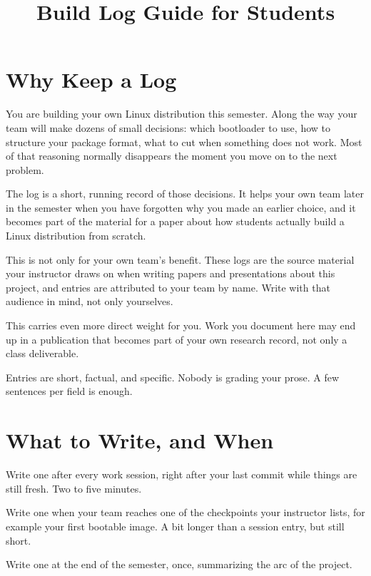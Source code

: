 \documentclass[11pt]{article}
\title{Build Log Guide for Students}
\author{}
\date{}
\begin{document}
\thispagestyle{fancy}


\section{Why Keep a Log}

You are building your own Linux distribution this semester. Along the way your team will make dozens of small decisions: which bootloader to use, how to structure your package format, what to cut when something does not work. Most of that reasoning normally disappears the moment you move on to the next problem.

The log is a short, running record of those decisions. It helps your own team later in the semester when you have forgotten why you made an earlier choice, and it becomes part of the material for a paper about how students actually build a Linux distribution from scratch.

This is not only for your own team's benefit. These logs are the source material your instructor draws on when writing papers and presentations about this project, and entries are attributed to your team by name. Write with that audience in mind, not only yourselves.

\begin{tipBox}
This carries even more direct weight for you. Work you document here may end up in a publication that becomes part of your own research record, not only a class deliverable.
\end{tipBox}

\begin{noteBox}
Entries are short, factual, and specific. Nobody is grading your prose. A few sentences per field is enough.
\end{noteBox}

\section{What to Write, and When}

\begin{description}[leftmargin=2.4cm, style=nextline]
  \item[Session entry] Write one after every work session, right after your last commit while things are still fresh. Two to five minutes.
  \item[Milestone entry] Write one when your team reaches one of the checkpoints your instructor lists, for example your first bootable image. A bit longer than a session entry, but still short.
  \item[Reflection] Write one at the end of the semester, once, summarizing the arc of the project.
\end{description}
\end{document}

